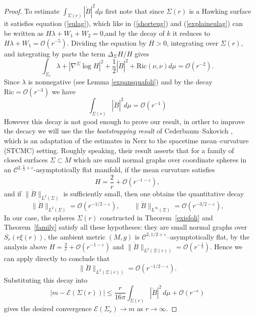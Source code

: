 \documentclass[12pt,a4paper]{amsart}
\theoremstyle{plain}
\theoremstyle{definition}
\begin{document}
\begin{proof}
To estimate $\int_{\Sigma(r)} |\mathring{B}|^2d\mu$ first note that since $\Sigma(r)$ is a Hawking surface it satisfies equation (\ref{eulag}), which like in (\ref{shorteug}) and (\ref{explaineulag}) can be written as $ H\lambda+ W_1 + W_2=0$,and  by the decay of $k$ it reduces to $ H\lambda+ W_1 =\mathcal{O}(r^{-5})$. Dividing the  equation by $H>0$, integrating over $\Sigma(r)$,
and integrating by parts the term $\Delta_\Sigma H/H$ gives
\begin{equation}
    \int_{\Sigma_r}\lambda+ |\nabla^\Sigma  \log H|^2 + \frac{1}{2} |\mathring{B}|^2 + \mathrm{Ric}(\nu,\nu) d\mu = \mathcal{O}(r^{-2}).
\end{equation}
 Since $\lambda$ is nonnegative (see Lemma \ref{expansquafoli}) and by the decay  $\mathrm{Ric}= \mathcal{O}(r^{-3}) $ we have 
\begin{equation}
    \int_{\Sigma(r)} |\mathring{B}|^2d\mu= \mathcal{O}(r^{-1})
\end{equation}
However this decay is not good enough to prove our result, in orther to improve the decacy we will use the  the \emph{bootstrapping result}
of Cederbaum--Sakovich \cite[Proposition 4.5]{STCMC},
which is an adaptation of the estimates in
Nerz \cite[Proposition 2.4]{Nerz} to the
spacetime mean--curvature (STCMC) setting. Roughly speaking, their result asserts that for a family of closed surfaces
$\Sigma\subset M$ which are small normal graphs over coordinate spheres
in an  $\mathcal{C}^{2, \frac{1}{2}+\varepsilon}$-asymptotically flat manifold, if the mean curvature satisfies
\[
H = \frac{2}{r} + \mathcal{O}(r^{-1-\varepsilon}),
\]
and if $\|\mathring{B}\|_{L^{2}(\Sigma)}$ is sufficiently small,
then one obtains the quantitative decay
\[
\|\mathring{B}\|_{L^{2}(\Sigma)} = \mathcal{O}(r^{-1/2-\varepsilon}),
\qquad
\|\mathring{B}\|_{L^{\infty}(\Sigma)} = \mathcal{O}(r^{-3/2-\varepsilon}),
\]
In our case, the spheres $\Sigma(r)$ constructed in
Theorem~\ref{exisfoli} and Theorem~\ref{family}
satisfy all these hypotheses:
they are small normal graphs over $S_{r}(r\xi(r))$,
the ambient metric $(M,g)$ is $\mathcal{C}^{2,1/2+\varepsilon}$--asymptotically flat, by the analysis above
$H=\tfrac{2}{r}+\mathcal{O}(r^{-1-\varepsilon})$
and $\|\mathring{B}\|_{L^{2}(\Sigma(r))}=\mathcal{O}(r^{-\frac{1}{2}})$.
Hence we can apply
\cite[Proposition 4.5]{STCMC}
directly to conclude that
\[
\|\mathring{B}\|_{L^{2}(\Sigma(r))}=\mathcal{O}(r^{-1/2-\varepsilon}).
\]
Substituting this decay into
\[
|m-\mathcal{E}(\Sigma(r))|
\le \frac{r}{16\pi}\!\int_{\Sigma(r)}|\mathring{B}|^{2}\,d\mu
+\mathcal{O}(r^{-\epsilon})
\]
gives the desired convergence
$\mathcal{E}(\Sigma_{r})\to m$ as $r\to\infty$.
\end{proof}
\end{document}
